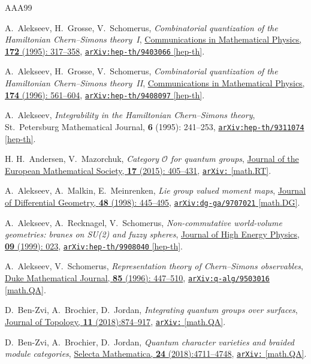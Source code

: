 \documentclass[12pt,dvipsnames]{article}
\numberwithin{equation}{section}
\theoremstyle{definition}
\newcommand{\1}{\ensuremath{\mathbbm{1}}}
\newcommand\arxiv[2]{\href{https://arXiv.org/abs/#1}{\texttt{arXiv:\allowbreak #1} #2}}
\newcommand\doi[2]{\href{https://doi.org/#1}{#2}}
\begin{document}
\begin{thebibliography}{AAA99}
\small
\setlength{\itemsep}{-1pt}

A.~Alekseev, H.~Grosse, V.~Schomerus,
\textit{Combinatorial quantization of the Hamiltonian Chern--Simons theory~I},
\doi{10.1007/BF02099431}{Communications in Mathematical Physics, \textbf{172} (1995): 317–358},
\arxiv{hep-th/9403066}{[hep-th]}.
 
A.~Alekseev, H.~Grosse, V.~Schomerus,
\textit{Combinatorial quantization of the Hamiltonian Chern--Simons theory~II},
\doi{10.1007/BF02101528}{Communications in Mathematical Physics, \textbf{174} (1996): 561–604},
\arxiv{hep-th/9408097}{[hep-th]}.

A.~Alekseev,
\textit{Integrability in the Hamiltonian Chern--Simons theory},
St.~Petersburg Mathematical Journal, \textbf{6} (1995): 241–253,
\arxiv{hep-th/9311074}{[hep-th]}.
 
H. H.~Andersen, V.~Mazorchuk,
\textit{Category {$\mathcal{O}$} for quantum groups},
\doi{10.4171/JEMS/506}{Journal of the European Mathematical Society, \textbf{17} (2015): 405–431},
\arxiv{1105.5500}{[math.RT]}.
 
A.~Alekseev, A.~Malkin, E.~Meinrenken,
\textit{Lie group valued moment maps},
\doi{10.4310/jdg/1214460860}{Journal of Differential Geometry, \textbf{48} (1998): 445–495},
\arxiv{dg-ga/9707021}{[math.DG]}.
 
A.~Alekseev, A.~Recknagel, V.~Schomerus,
\textit{Non-commutative world-volume geometries: branes on SU(2) and fuzzy spheres},
\doi{10.1088/1126-6708/1999/09/023}{Journal of High Energy Physics, \textbf{09} (1999): 023},
\arxiv{hep-th/9908040}{[hep-th]}.
 
A.~Alekseev, V.~Schomerus,
\textit{Representation theory of Chern--Simons observables},
\doi{10.1215/S0012-7094-96-08519-1}{Duke Mathematical Journal, \textbf{85} (1996): 447–510},
\arxiv{q-alg/9503016}{[math.QA]}.
 
D.~Ben-Zvi, A.~Brochier, D.~Jordan,
\textit{Integrating quantum
groups over surfaces},
\doi{10.1112/topo.12072}{Journal of Topology, \textbf{11} (2018):874–917},
\arxiv{1501.04652}{[math.QA]}.
 
D.~Ben-Zvi, A.~Brochier, D.~Jordan,
\textit{Quantum character varieties and braided module categories},
\doi{10.1007/s00029-018-0426-y}{Selecta Mathematica, \textbf{24} (2018):4711–4748},
\arxiv{1606.04769}{[math.QA]}.


\end{thebibliography}
\end{document}
